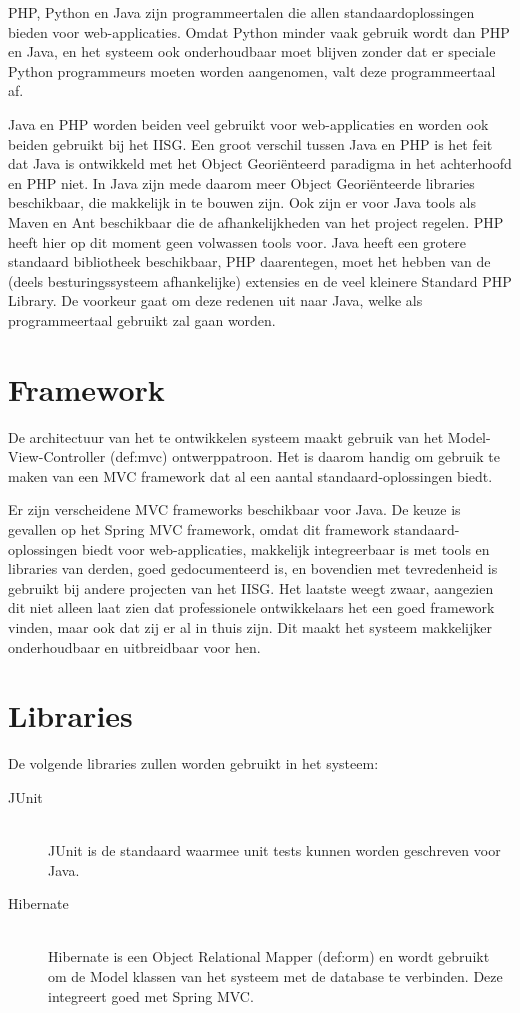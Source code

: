 \documentclass[a4paper,titlepage]{report}
\begin{document}
    PHP, Python en Java zijn programmeertalen die allen standaardoplossingen
    bieden voor web-applicaties. Omdat Python minder vaak gebruik wordt dan PHP
    en Java, en het systeem ook onderhoudbaar moet blijven zonder dat er
    speciale Python programmeurs moeten worden aangenomen, valt deze
    programmeertaal af.

    Java en PHP worden beiden veel gebruikt voor web-applicaties en worden ook
    beiden gebruikt bij het IISG. Een groot verschil tussen Java en PHP is het
    feit dat Java is ontwikkeld met het Object Geori\"enteerd paradigma in het
    achterhoofd en PHP niet. In Java zijn mede daarom meer Object
    Geori\"enteerde libraries beschikbaar, die makkelijk in te bouwen zijn. Ook
    zijn er voor Java tools als Maven en Ant beschikbaar die de afhankelijkheden
    van het project regelen. PHP heeft hier op dit moment geen volwassen tools
    voor. Java heeft een grotere standaard bibliotheek
    beschikbaar, PHP daarentegen, moet het hebben van de (deels besturingssysteem
    afhankelijke) extensies en de veel kleinere Standard PHP Library. De
    voorkeur gaat om deze redenen uit naar Java, welke als programmeertaal
    gebruikt zal gaan worden.

  \section{Framework}
    De architectuur van het te ontwikkelen systeem maakt gebruik van het
    Model-View-Controller (\gls{def:mvc}) ontwerppatroon. Het is daarom handig
    om gebruik te maken van een MVC framework dat al een aantal
    standaard-oplossingen biedt.

    Er zijn verscheidene MVC frameworks beschikbaar voor Java. De keuze is
    gevallen op het Spring MVC framework, omdat dit framework
    standaard-oplossingen biedt voor web-applicaties, makkelijk integreerbaar is
    met tools en libraries van derden, goed gedocumenteerd is, en bovendien met
    tevredenheid is gebruikt bij andere projecten van het IISG. Het laatste
    weegt zwaar, aangezien dit niet alleen laat zien dat professionele
    ontwikkelaars het een goed framework vinden, maar ook dat zij er al in thuis
    zijn. Dit maakt het systeem makkelijker onderhoudbaar en uitbreidbaar voor
    hen.

  \section{Libraries}
    De volgende libraries zullen worden gebruikt in het systeem:
    \begin{description}
      \item[JUnit]\hfill\\
        JUnit is de standaard waarmee unit tests kunnen worden
        geschreven voor Java.
      \item[Hibernate]\hfill\\
        Hibernate is een Object Relational Mapper (\gls{def:orm}) en wordt
        gebruikt om de Model klassen van het systeem met de database te
        verbinden. Deze integreert goed met Spring MVC.
    \end{description}
\end{document}
